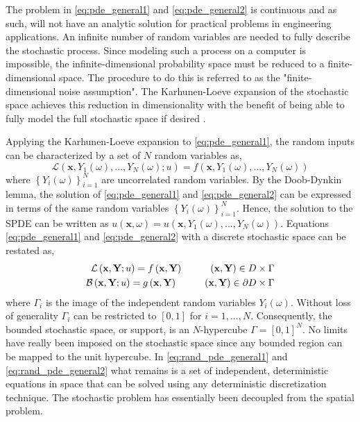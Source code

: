 The problem in \ref{eq:pde_general1} and \ref{eq:pde_general2} is continuous and as such, will not have an analytic solution for practical problems in engineering applications. An infinite number of random variables are needed to fully describe the stochastic process. Since modeling such a process on a computer is impossible, the infinite-dimensional probability space must be reduced to a finite-dimensional space. The procedure to do this is referred to as the "finite-dimensional noise assumption". The Karhunen-Loeve expansion of the stochastic space achieves this reduction in dimensionality with the benefit of being able to fully model the full stochastic space if desired \cite{KarLoeXiu}.

Applying the Karhunen-Loeve expansion to \ref{eq:pde_general1}, the random inputs can be characterized by a set of $N$ random variables as,
\begin{equation} \label{eq:rand_pde_general}
    \mathcal{L}\left(\textbf{x},Y_{1}(\omega),...,Y_{N}(\omega);u\right) = 
     f\left(\textbf{x},Y_{1}(\omega),...,Y_{N}(\omega)\right)
\end{equation}
where $\left\{Y_i(\omega)\right\}_{i=1}^N$ are uncorrelated random variables. By the Doob-Dynkin lemma, the solution of \ref{eq:pde_general1} and \ref{eq:pde_general2} can be expressed in terms of the same random variables $\left\{Y_i(\omega)\right\}_{i=1}^N$. Hence, the solution to the \ac{SPDE} can be written as $u\left(\textbf{x},\omega\right)=u\left(\textbf{x},Y_{1}(\omega),...,Y_{N}(\omega)\right)$. Equations \ref{eq:pde_general1} and \ref{eq:pde_general2} with a discrete stochastic space can be restated as, 
\begin{eqnarray}
\label{eq:rand_pde_general1}
    \mathcal{L}\left(\textbf{x},\textbf{Y};u\right) = 
     f\left(\textbf{x},\textbf{Y}\right) \hspace{1 cm} \left(\textbf{x},
      \textbf{Y}\right)\in D \times \Gamma \\
\label{eq:rand_pde_general2}
    \mathcal{B}\left(\textbf{x},\textbf{Y};u\right) = 
     g\left(\textbf{x},\textbf{Y}\right) \hspace{1 cm} \left(\textbf{x}, 
      \textbf{Y}\right)\in \partial D \times \Gamma 
\end{eqnarray} 
where $\Gamma_i$ is the image of the independent random variables $Y_i\left(\omega\right)$. Without loss of generality $\Gamma_i$ can be restricted to $\left[0,1\right]$ for $i=1,...,N$. Consequently, the bounded stochastic space, or support, is an $N$-hypercube $\Gamma=\left[0,1\right]^N$. No limits have really been imposed on the stochastic space since any bounded region can be mapped to the unit hypercube. In \ref{eq:rand_pde_general1} and \ref{eq:rand_pde_general2} what remains is a set of independent, deterministic equations in space that can be solved using any deterministic discretization technique. The stochastic problem has essentially been decoupled from the spatial problem.          